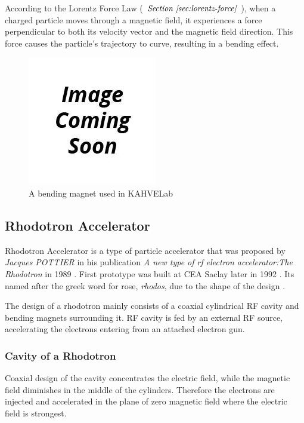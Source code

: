 \documentclass[a4paper,oneside,12pt]{report}
\numberwithin{equation}{chapter}
\begin{document}
According to the Lorentz Force Law ( $\textit{Section \ref{sec:lorentz-force}}$ ), when a charged particle moves through a magnetic field, it experiences a force perpendicular to both its velocity 
vector and the magnetic field direction. This force causes the particle's trajectory to curve, resulting in a bending effect.
\begin{figure}[H]
    \centering
    \includegraphics[scale=0.75]{./figures/to_be_added.png}
    \caption{A bending magnet used in KAHVELab}
\end{figure}

\subsection{Rhodotron Accelerator} \label{sec:theory_rhodo}

Rhodotron Accelerator is a type of particle accelerator that was proposed by \textit{Jacques POTTIER} in his publication \textit{A new type of rf electron accelerator:The Rhodotron} in 1989 \cite{rhodo_pottier}. 
First prototype was built at CEA Saclay later in 1992 \cite{rhodo_prototype}. Its named after the greek word for rose, \textit{rhodos}, due to the shape of the design \cite{rhodos}.

The design of a rhodotron mainly consists of a coaxial cylindrical RF cavity and bending magnets surrounding it. RF cavity is fed by an external RF source, accelerating the electrons entering from an attached electron gun.

\subsubsection{Cavity of a Rhodotron} \label{sec:cavity_of_a_rhodotron}

Coaxial design of the cavity concentrates the electric field, while the magnetic field diminishes in the middle of the cylinders. 
Therefore the electrons are injected and accelerated in the plane of zero magnetic field where the electric field is strongest.
\end{document}
